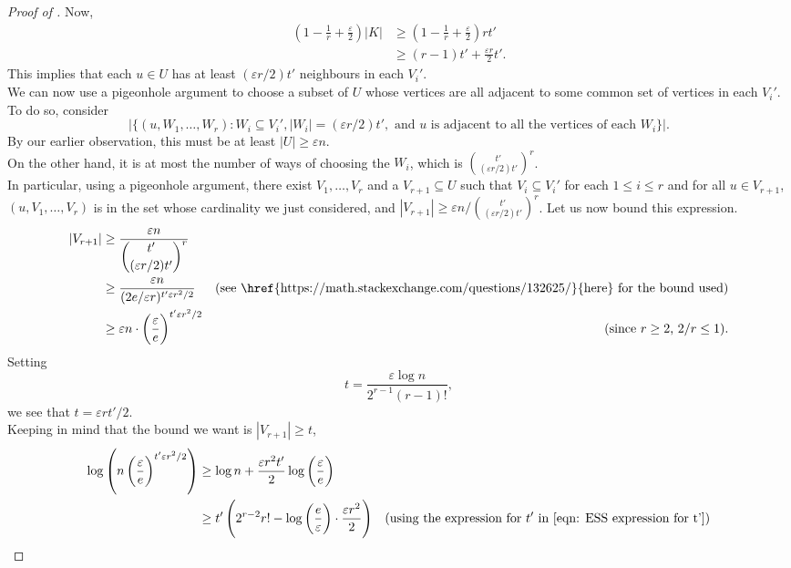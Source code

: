 \begin{proof}[Proof of ]
				Now,
				\begin{align*}
					\left(1 - \frac{1}{r} + \frac{\varepsilon}{2} \right)|K| &\ge \left(1 - \frac{1}{r} + \frac{\varepsilon}{2} \right) rt' \\
					&\ge (r-1)t' + \frac{\varepsilon r}{2} t'.	
				\end{align*}
				This implies that each $u \in U$ has at least $(\varepsilon r/2)t'$ neighbours in each $V_i'$.\\
				We can now use a pigeonhole argument to choose a subset of $U$ whose vertices are all adjacent to some common set of vertices in each $V_i'$. To do so, consider
				\[ |\{(u, W_1,\ldots,W_r) : W_i \subseteq V_i', |W_i| = (\varepsilon r/2)t',\text{ and $u$ is adjacent to all the vertices of each $W_i$}\}|. \]
				By our earlier observation, this must be at least $|U| \ge \varepsilon n$.\\
				On the other hand, it is at most the number of ways of choosing the $W_i$, which is $\binom{t'}{(\varepsilon r/2)t'}^r$.\\
				In particular, using a pigeonhole argument, there exist $V_1,\ldots,V_r$ and a $V_{r+1}\subseteq U$ such that $V_i \subseteq V_i'$ for each $1\le i\le r$ and for all $u \in V_{r+1}$, $(u,V_1,\ldots,V_r)$ is in the set whose cardinality we just considered, and $|V_{r+1}| \ge \varepsilon n / \binom{t'}{(\varepsilon r/2)t'}^r$. Let us now bound this expression.
				\begin{align*}
					|V_{r+1}| &\ge \dfrac{\varepsilon n}{\dbinom{t'}{(\varepsilon r/2)t'}^r} \\
					&\ge \frac{\varepsilon n}{ (2e/\varepsilon r)^{t'\varepsilon r^2/2}} & \text{(see \href{https://math.stackexchange.com/questions/132625/}{here} for the bound used)} \\
					&\ge \varepsilon n\cdot\left(\frac{\varepsilon}{e}\right)^{t'\varepsilon r^2/2} & (\text{since $r \ge 2$, $2/r \le 1$}).
				\end{align*}
				Setting
				\[ t = \frac{\varepsilon\log n}{2^{r-1}(r-1)!}, \]
				we see that $t = \varepsilon rt'/2$.\\
				Keeping in mind that the bound we want is $|V_{r+1}| \ge t$,
				\begin{align*}
					\log \left(n \left(\frac{\varepsilon}{e}\right)^{t' \varepsilon r^2/2}\right) &\ge \log n + \frac{\varepsilon r^2 t'}{2} \log\left(\frac{\varepsilon}{e}\right) \\
					&\ge t' \left( 2^{r-2} r! - \log\left(\frac{e}{\varepsilon}\right) \cdot \frac{\varepsilon r^2}{2} \right) & \text{(using the expression for $t'$ in \eqref{eqn: ESS expression for t'})} \\

\end{align*}
\end{proof}
